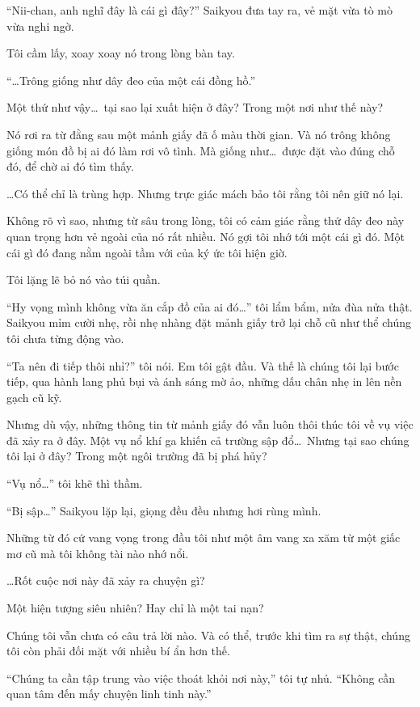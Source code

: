 \documentclass[../main.tex]{subfiles}
\begin{document}
``Nii-chan, anh nghĩ đây là cái gì đây?'' Saikyou đưa tay ra, vẻ mặt vừa tò mò vừa nghi ngờ.

Tôi cầm lấy, xoay xoay nó trong lòng bàn tay.

``\dots Trông giống như dây đeo của một cái đồng hồ.''

Một thứ như vậy\dots\ tại sao lại xuất hiện ở đây? Trong một nơi như thế này?

Nó rơi ra từ đằng sau một mảnh giấy đã ố màu thời gian. Và nó trông không giống món đồ bị ai đó làm rơi vô tình. Mà giống như\dots\ được đặt vào đúng chỗ đó, để chờ ai đó tìm thấy.

\dots Có thể chỉ là trùng hợp. Nhưng trực giác mách bảo tôi rằng tôi nên giữ nó lại.

Không rõ vì sao, nhưng từ sâu trong lòng, tôi có cảm giác rằng thứ dây đeo này quan trọng hơn vẻ ngoài của nó rất nhiều. Nó gợi tôi nhớ tới một cái gì đó. Một cái gì đó đang nằm ngoài tầm với của ký ức tôi hiện giờ.

Tôi lặng lẽ bỏ nó vào túi quần.

``Hy vọng mình không vừa ăn cắp đồ của ai đó\dots'' tôi lẩm bẩm, nửa đùa nửa thật. Saikyou mỉm cười nhẹ, rồi nhẹ nhàng đặt mảnh giấy trở lại chỗ cũ như thể chúng tôi chưa từng động vào.

``Ta nên đi tiếp thôi nhỉ?'' tôi nói. Em tôi gật đầu. Và thế là chúng tôi lại bước tiếp, qua hành lang phủ bụi và ánh sáng mờ ảo, những dấu chân nhẹ in lên nền gạch cũ kỹ.

Nhưng dù vậy, những thông tin từ mảnh giấy đó vẫn luôn thôi thúc tôi về vụ việc đã xảy ra ở đây. Một vụ nổ khí ga khiến cả trường sập đổ\dots\ Nhưng tại sao chúng tôi lại ở đây? Trong một ngôi trường đã bị phá hủy?

``Vụ nổ\dots'' tôi khẽ thì thầm.

``Bị sập\dots'' Saikyou lặp lại, giọng đều đều nhưng hơi rùng mình.

Những từ đó cứ vang vọng trong đầu tôi như một âm vang xa xăm từ một giấc mơ cũ mà tôi không tài nào nhớ nổi.

\dots Rốt cuộc nơi này đã xảy ra chuyện gì?

Một hiện tượng siêu nhiên? Hay chỉ là một tai nạn?

Chúng tôi vẫn chưa có câu trả lời nào. Và có thể, trước khi tìm ra sự thật, chúng tôi còn phải đối mặt với nhiều bí ẩn hơn thế.

``Chúng ta cần tập trung vào việc thoát khỏi nơi này,'' tôi tự nhủ. ``Không cần quan tâm đến mấy chuyện linh tinh này.''
\end{document}
